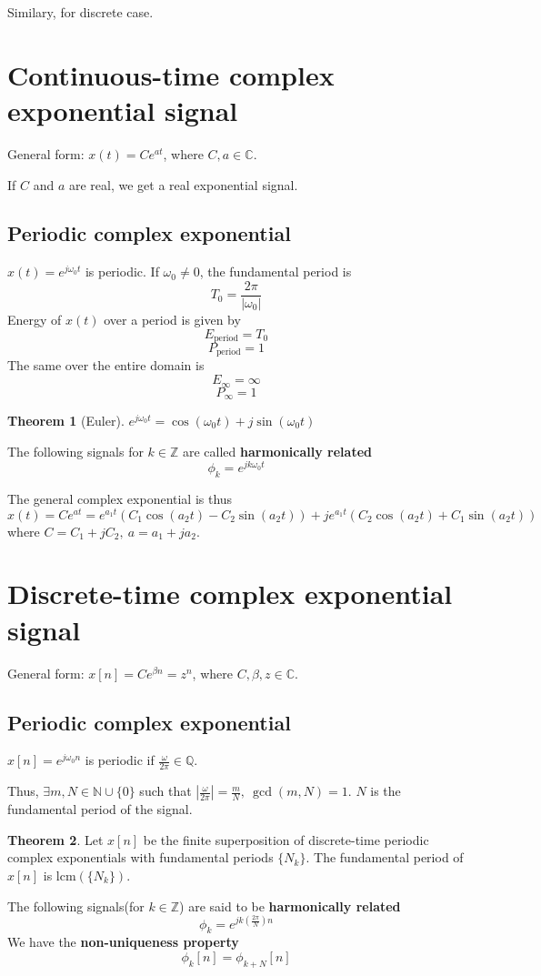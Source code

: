 \documentclass[10pt, a4paper]{extarticle}
\theoremstyle{definition}
\newtheorem*{thm}{Theorem}
\begin{document}
Similary, for discrete case.

\section{Continuous-time complex exponential signal}
General form: $x(t)=Ce^{at}$, where $C,a\in\mathbb{C}$.

If $C$ and $a$ are real, we get a real exponential signal.
\subsection{Periodic complex exponential}
$x(t)=e^{j\omega_0 t}$ is periodic. If $\omega_0\neq 0$, the fundamental period is \[T_0=\frac{2\pi}{|\omega_0|}\]
Energy of $x(t)$ over a period is given by\[E_{\text{period}}=T_0\]
\[P_{\text{period}}=1\]
The same over the entire domain is
\[E_\infty = \infty\]
\[P_\infty = 1\]
\begin{thm}[Euler]
	$e^{j\omega_0t}=\cos(\omega_0t)+j\sin(\omega_0t)$
\end{thm}
The following signals for $k\in \mathbb{Z}$ are called \textbf{harmonically related}
\[\phi_k=e^{jk\omega_0 t}\]

The general complex exponential is thus
\[x(t)=Ce^{at}=e^{a_1 t}\left(C_1\cos(a_2 t)-C_2\sin(a_2 t)\right)+je^{a_1 t}\left(C_2\cos(a_2 t)+C_1\sin(a_2 t)\right)\]
where $C=C_1+jC_2,\ a=a_1+ja_2$.

\section{Discrete-time complex exponential signal}
General form: $x[n]=Ce^{\beta n}=z^n$, where $C,\beta,z\in \mathbb{C}$.
\subsection{Periodic complex exponential}
$x[n]=e^{j\omega_0 n}$ is periodic if $\frac{\omega}{2\pi}\in\mathbb{Q}$.

Thus, $\exists m,N\in\mathbb{N}\cup\{0\}$ such that $|\frac{\omega}{2\pi}|=\frac{m}{N},\ \gcd(m,N)=1$. $N$ is the fundamental period of the signal.
\begin{thm}
	Let $x[n]$ be the finite superposition of discrete-time periodic complex exponentials with fundamental periods $\{N_k\}$. The fundamental period of $x[n]$ is $\text{lcm}(\{N_k\})$.
\end{thm}

The following signals(for $k\in\mathbb{Z}$) are said to be \textbf{harmonically related}
\[\phi_k=e^{jk\left(\frac{2\pi}{N}\right)n}\]
We have the \textbf{non-uniqueness property}
\[\phi_k[n]=\phi_{k+N}[n]\]
\end{document}
